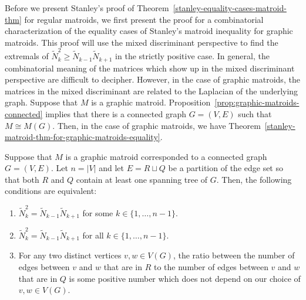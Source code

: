\documentclass{puthesis-UG}
\begin{document}
Before we present Stanley's proof of Theorem~\ref{stanley-equality-cases-matroid-thm} for regular matroids, we first present the proof for a combinatorial characterization of the equality cases of Stanley's matroid inequality for graphic matroids. This proof will use the mixed discriminant perspective to find the extremals of $\widetilde{N}_k^2 \geq \widetilde{N}_{k-1} \widetilde{N}_{k+1}$ in the strictly positive case. In general, the combinatorial meaning of the matrices which show up in the mixed discriminant perspective are difficult to decipher. However, in the case of graphic matroids, the matrices in the mixed discriminant are related to the Laplacian of the underlying graph. Suppose that $M$ is a graphic matroid. Proposition~\ref{prop:graphic-matroids-connected} implies that there is a connected graph $G = (V, E)$ such that $M \cong M(G)$. Then, in the case of graphic matroids, we have Theorem~\ref{stanley-matroid-thm-for-graphic-matroids-equality}.

\begin{thm} \label{stanley-matroid-thm-for-graphic-matroids-equality}
	Suppose that $M$ is a graphic matroid corresponded to a connected graph $G = (V, E)$. Let $n = |V|$ and let $E = R \sqcup Q$ be a partition of the edge set so that both $R$ and $Q$ contain at least one spanning tree of $G$. Then, the following conditions are equivalent:
	\begin{enumerate}[label = (\alph*)]
		\item $\widetilde{N}_k^2 = \widetilde{N}_{k-1} \widetilde{N}_{k+1}$ for some $k \in \{1, \ldots, n-1\}$.

		\item $\widetilde{N}_k^2 = \widetilde{N}_{k-1} \widetilde{N}_{k+1}$ for all $k \in \{1, \ldots, n-1\}$. 

		\item For any two distinct vertices $v, w \in V(G)$, the ratio between the number of edges between $v$ and $w$ that are in $R$ to the number of edges between $v$ and $w$ that are in $Q$ is some positive number which does not depend on our choice of $v, w \in V(G)$. 
	\end{enumerate}
\end{thm}
\end{document}
